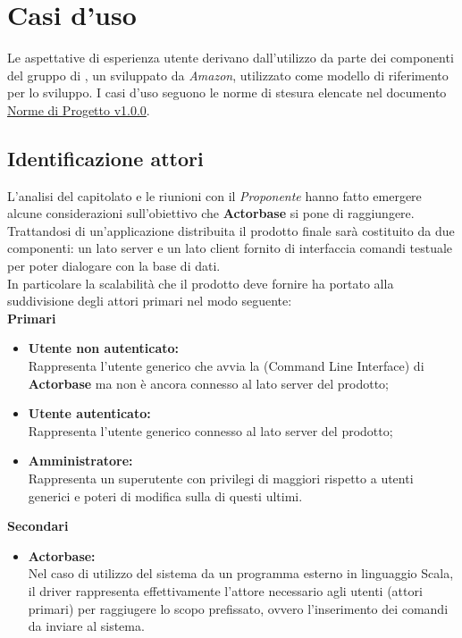 \documentclass{scalatekids-article}
\begin{document}
\section{Casi d'uso}

Le aspettative di esperienza utente derivano dall'utilizzo da parte dei
componenti del gruppo di , un  
sviluppato da \textit{Amazon}, utilizzato come modello di riferimento per lo sviluppo. I casi d'uso seguono le norme di stesura elencate nel documento \href{run:../Interni/NormeDiProgetto\_v1.0.0.pdf}{Norme di Progetto v1.0.0}.

\subsection{Identificazione attori}

L'analisi del capitolato e le riunioni con il \textit{Proponente} hanno fatto emergere
alcune considerazioni sull'obiettivo che \textbf{Actorbase} si pone di raggiungere.
Trattandosi di un'applicazione distribuita il prodotto finale sarà costituito
da due  componenti: un lato server e un lato client fornito di interfaccia
comandi testuale per poter dialogare con la base di dati.\\ In particolare la
scalabilità che il prodotto deve fornire ha portato alla suddivisione degli
attori primari nel modo seguente:\\
\textbf{Primari}
\begin{itemize}
\item\textbf{Utente non autenticato:}\\
  Rappresenta l'utente generico che avvia la  (Command Line Interface) di \textbf{Actorbase} ma non è ancora connesso al lato server del prodotto;
\item\textbf{Utente autenticato:}\\
  Rappresenta l'utente generico connesso al lato server del prodotto;
\item\textbf{Amministratore:}\\
  Rappresenta un superutente con privilegi di  maggiori rispetto a utenti generici e poteri di modifica sulla  di questi ultimi.
\end{itemize}
\textbf{Secondari}
\begin{itemize}
\item\textbf{Actorbase:}\\ %
  Nel caso di utilizzo del sistema da un programma esterno in linguaggio Scala, il driver rappresenta effettivamente l'attore necessario agli utenti (attori primari) per raggiugere
  lo scopo prefissato, ovvero l'inserimento dei comandi da inviare al sistema.
\end{itemize}
\end{document}
